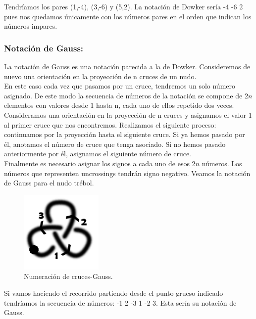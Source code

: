 \documentclass[14pt]{extarticle}
\begin{document}
  Tendríamos los pares (1,-4), (3,-6) y (5,2). La notación de Dowker sería -4 -6 2 pues nos quedamos únicamente con los números pares en el orden que indican los números impares.\\

\begin{center}
	\item \subsubsection{Notación de Gauss:}
\end{center}
La notación de Gauss es una notación parecida a la de Dowker. Consideremos de nuevo una orientación en la proyección de n cruces de un nudo.\\

En este caso cada vez que pasamos por un cruce, tendremos un solo número asignado. De este modo la secuencia de números de la notación se compone de $2n$ elementos con valores desde 1 hasta n, cada uno de ellos repetido dos veces.\\

Consideramos una orientación en la proyección de n cruces y asignamos el valor 1 al primer cruce que nos encontremos. Realizamos el siguiente proceso: continuamos por la proyección hasta el siguiente cruce. Si ya hemos pasado por él, anotamos el número de cruce que tenga asociado. Si no hemos pasado anteriormente por él, asignamos el siguiente número de cruce.\\

Finalmente es necesario asignar los signos a cada uno de esos $2n$ números. Los números que representen uncrossings tendrán signo negativo. Veamos la notación de Gauss para el nudo trébol.\\
   \begin{figure}[h!]
   	\centering
   	\includegraphics[width=4cm]{inudos/3fcon2gaus.png}
   	\caption{Numeración de cruces-Gauss.}
   	\label{gaus1} 
   \end{figure} 
Si vamos haciendo el recorrido partiendo desde el punto grueso indicado tendríamos la secuencia de números: -1 2 -3 1 -2 3. Esta sería su notación de Gauss.
\end{document}
